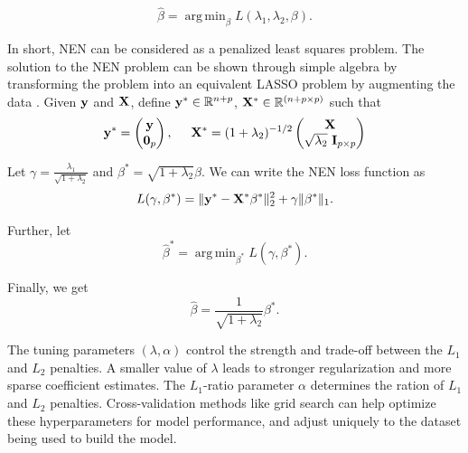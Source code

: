 \documentclass[
	a4paper, %
	10pt, %
	unnumberedsections, %
	twoside, %
]{LTJournalArticle}
\newcommand{\R}{\mathbb R}
\newcommand{\1}{\mathbbm{1}}
\DeclareMathOperator*{\argmin}{arg\,min}
\begin{document}
\begin{equation}
\label{eq:EN}
    \hat{\beta} = \argmin_\beta L(\lambda_1, \lambda_2, \beta). 
\end{equation}


In short, NEN can be considered as a penalized least squares problem. The solution to the NEN problem can be shown through simple algebra by transforming the problem into an equivalent LASSO problem by augmenting the data \cite{Zou2005}. Given ${\bf y}$ and  ${\bf X}$, define ${\bf y}^* \in \R^{n+p}$, ${\bf X}^* \in \R^{(n+p \times p)}$ such that
\begin{equation}
    {\bf y}^* = \begin{pmatrix}
        {\bf y} \\ {\bf 0}_p
    \end{pmatrix}, \hspace{5mm}
    {\bf X}^* =(1 + \lambda_2)^{-1/2} \begin{pmatrix}
        {\bf X} \\ \sqrt{\lambda_2} \ {\bf I}_{p \times p}
    \end{pmatrix}
\end{equation}

\noindent Let $\gamma = \frac{\lambda_1}{\sqrt{1 + \lambda_2}}$ and $\beta^* = \sqrt{1 + \lambda_2} \beta$. We can write the NEN loss function as 
\begin{equation}
    L(\gamma, \beta^*) = \|{\bf y}^* - {\bf X}^* \beta^*\|_2^2 + \gamma \|\beta^*\|_1.
\end{equation}


\noindent Further, let
\begin{equation}
\label{eq:EN-star}
    \hat{\beta}^* = \argmin_{\beta^*} L(\gamma, \beta^*). 
\end{equation}

\noindent Finally, we get
\begin{equation}
    \hat \beta = \frac{1}{\sqrt{1 + \lambda_2}} \beta^*.
\end{equation}



The tuning parameters $(\lambda, \alpha)$ control the strength and trade-off between the $L_1$ and $L_2$ penalties. A smaller value of $\lambda$ leads to stronger regularization and more sparse coefficient estimates. The $L_1$-ratio parameter $\alpha$ determines the ration of $L_1$ and $L_2$ penalties. Cross-validation methods like grid search can help optimize these hyperparameters for model performance, and adjust uniquely to the dataset being used to build the model.  
\end{document}
